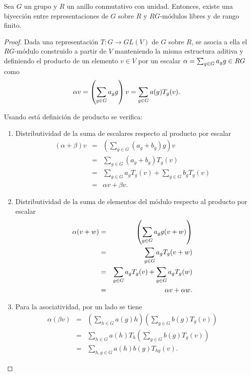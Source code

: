  \begin{proposicion}
 Sea $G$ un grupo y $R$ un anillo conmutativo con unidad. Entonces, existe una biyección entre representaciones de $G$ sobre $R$ y $RG\mbox{-módulos}$ libres y de rango finito. 
 \end{proposicion}
 \begin{proof}
 Dada una representación $T \colon G \to GL(V)$ de $G$ sobre $R$, se asocia a ella el $RG\mbox{-módulo}$ construido a partir de $V$ manteniendo la misma estructura aditiva y definiendo el producto de un elemento $v \in V$ por un escalar $\alpha = \sum_{g \in G} a_{g} g \in RG$ como 
 \begin{equation}\label{defproducto}
 \alpha v = \left( \sum_{g \in G} a_{g} g  \right)v = \sum_{g \in G}a(g)T_g(v).
 \end{equation}
 
 Usando está definición de producto se verifica:
 \begin{enumerate}
 \item Distributividad de la suma de escalares respecto al producto por escalar \begin{eqnarray*}
  (\alpha + \beta)v &=& \left( \sum_{g \in G}(a_g + b_g)g  \right)v \\
   &=& \sum_{g \in G}(a_g + b_g)T_g(v) \\
   &=& \sum_{g \in G}a_gT_g(v) + \sum_{g \in G}b_gT_g(v) \\
    &=& \alpha v + \beta v .
 \end{eqnarray*}
 \item Distributividad de la  suma de elementos del módulo respecto al producto por escalar
 \begin{eqnarray*}
 \alpha(v + w) &=& \left(\sum_{g \in G} a_{g} g(v + w)  \right) \\
  &=& \sum_{g \in G}a_gT_g(v+w) \\
  &=& \sum_{g \in G}a_gT_g(v) + \sum_{g \in G}a_gT_g(w) \\
  &=& \alpha v + \alpha w .
 \end{eqnarray*}
 \item Para la asociatividad, por un lado se tiene
 \begin{eqnarray*}
 \alpha(\beta v) &=& \left( \sum_{h \in G}a(g)h \right)\left( \sum_{g \in G}b(g)T_g(v) \right) \\
  &=& \sum_{h \in G}a(h)T_h\left( \sum_{g \in G}b(g)T_g(v)  \right) \\
  &=& \sum_{h, g \in G}a(h)b(g)T_{hg}(v).
 \end{eqnarray*}
 

\end{enumerate}
\end{proof}
